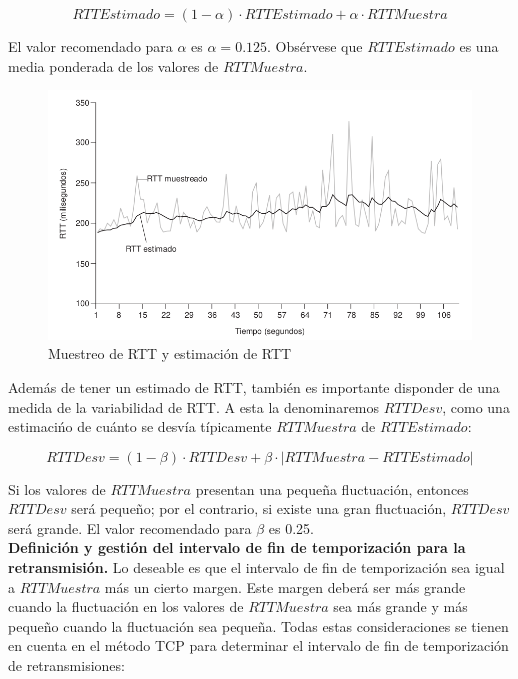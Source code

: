 \documentclass[a4paper,11pt]{article}
\begin{document}
\begin{equation*}
RTTEstimado = (1-\alpha)\cdot RTTEstimado + \alpha \cdot RTTMuestra
\end{equation*}

El valor recomendado para $\alpha$ es $\alpha=0.125$. Obsérvese que $RTTEstimado$ es una media ponderada de los valores de $RTTMuestra$.

\begin{figure}[h]
\centering
\caption{Muestreo de RTT y estimación de RTT}
\includegraphics[scale=1,width=1.1\textwidth]{muestreo_rtt.png}
\end{figure}

Además de tener un estimado de RTT, también es importante disponder de una medida de la variabilidad de RTT. A esta la denominaremos $RTTDesv$, como una estimacińo de cuánto se desvía típicamente $RTTMuestra$ de $RTTEstimado$:

\begin{equation*}
RTTDesv =(1-\beta)\cdot RTTDesv + \beta \cdot |RTTMuestra - RTTEstimado|
\end{equation*}

Si los valores de $RTTMuestra$ presentan una pequeña fluctuación, entonces $RTTDesv$ será pequeño; por el contrario, si existe una gran fluctuación, $RTTDesv$ será grande. El valor recomendado para $\beta$ es 0.25. \\

\textbf{Definición y gestión del intervalo de fin de temporización para la retransmisión.} Lo deseable es que el intervalo de fin de temporización sea igual a $RTTMuestra$ más un cierto margen. Este margen deberá ser más grande cuando la fluctuación en los valores de $RTTMuestra$ sea más grande y más pequeño cuando la fluctuación sea pequeña. Todas estas consideraciones se tienen en cuenta en el método TCP para determinar el intervalo de fin de temporización de retransmisiones: 
\end{document}
